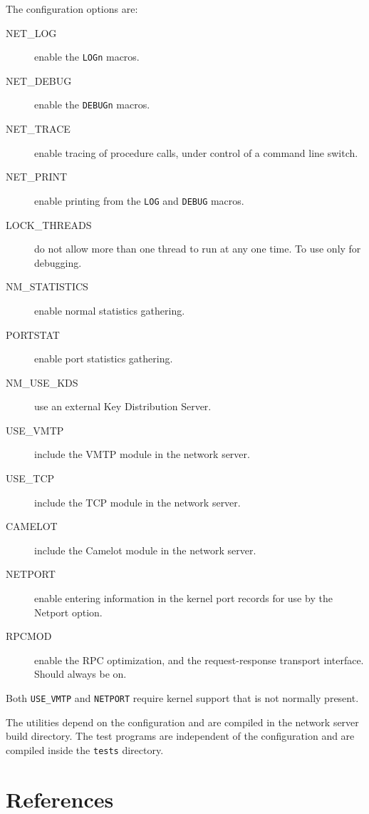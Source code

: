 The configuration options are:
\begin{description}
\item[NET\_LOG] enable the \verb"LOGn" macros.
\item[NET\_DEBUG] enable the \verb"DEBUGn" macros.
\item[NET\_TRACE] enable tracing of procedure calls, under control of
a command line switch.
\item[NET\_PRINT] enable printing from the \verb"LOG" and
\verb"DEBUG" macros.
\item[LOCK\_THREADS] do not allow more than one thread to run at
any one time. To use only for debugging.
\item[NM\_STATISTICS] enable normal statistics gathering. 
\item[PORTSTAT] enable port statistics gathering. 
\item[NM\_USE\_KDS] use an external Key Distribution Server.
\item[USE\_VMTP] include the VMTP module in the network server.
\item[USE\_TCP] include the TCP module in the network server.
\item[CAMELOT] include the Camelot module in the network server.
\item[NETPORT] enable entering information in the kernel port
records for use by the Netport option.
\item[RPCMOD] enable the RPC optimization, and the
request-response transport interface. Should always be on.
\end{description}

Both \verb"USE_VMTP" and \verb"NETPORT" require kernel support that is
not normally present.

The utilities depend on the configuration and are compiled in the
network server build directory. The test programs are independent of
the configuration and are compiled inside the \verb"tests" directory.

\section*{References}







